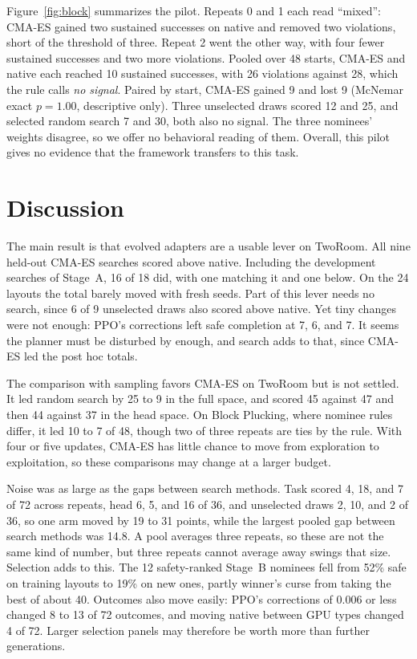 \documentclass[dvipsnames,format=sigconf]{acmart}
\newcommand{\cmaes}{CMA-ES}
\begin{document}
Figure~\ref{fig:block} summarizes the pilot. Repeats 0 and 1 each read ``mixed'': \cmaes{} gained two sustained
successes on native and removed two violations, short of the threshold of three. Repeat 2 went the other way,
with four fewer sustained successes and two more violations. Pooled over 48 starts, \cmaes{} and native each
reached 10 sustained successes, with 26 violations against 28, which the rule calls \emph{no signal}. Paired by
start, \cmaes{} gained 9 and lost 9 (McNemar exact $p=1.00$, descriptive only). Three unselected draws scored
12 and 25, and selected random search 7 and 30, both also no signal. The three nominees' weights disagree, so we
offer no behavioral reading of them. Overall, this pilot gives no evidence that the framework transfers to this
task. %

\section{Discussion}
\label{sec:discussion}

The main result is that evolved adapters are a usable lever on TwoRoom. All nine held-out \cmaes{} searches
scored above native. Including the development searches of Stage~A, 16 of 18 did, with one matching it and one
below. On the 24 layouts the total barely moved with fresh seeds. Part of this lever needs no search, since 6 of 9
unselected draws also scored above native. Yet tiny changes were not enough: PPO's corrections left safe
completion at 7, 6, and 7. It seems the planner must be disturbed by enough, and search adds to that, since
\cmaes{} led the post hoc totals. %

The comparison with sampling favors \cmaes{} on TwoRoom but is not settled. It led random search by 25 to 9 in
the full space, and scored 45 against 47 and then 44 against 37 in the head space. On Block Plucking, where
nominee rules differ, it led 10 to 7 of 48, though two of three repeats are ties by the rule. With four or
five updates, \cmaes{} has little chance to move from exploration to exploitation, so these comparisons may
change at a larger budget.

Noise was as large as the gaps between search methods. Task scored 4, 18, and 7 of 72 across repeats, head 6,
5, and 16 of 36, and unselected draws 2, 10, and 2 of 36, so one arm moved by 19 to 31 points, while the largest
pooled gap between search methods was 14.8. A pool averages three repeats, so these are not the same kind of
number, but three repeats cannot average away swings that size. Selection adds to this. The 12 safety-ranked
Stage~B nominees fell from 52\% safe on training layouts to 19\% on new ones, partly winner's curse from taking
the best of about 40. Outcomes also move easily: PPO's corrections of 0.006 or less changed 8 to 13 of 72
outcomes, and moving native between GPU types changed 4 of 72. Larger selection panels may therefore be worth
more than further generations.
\end{document}
